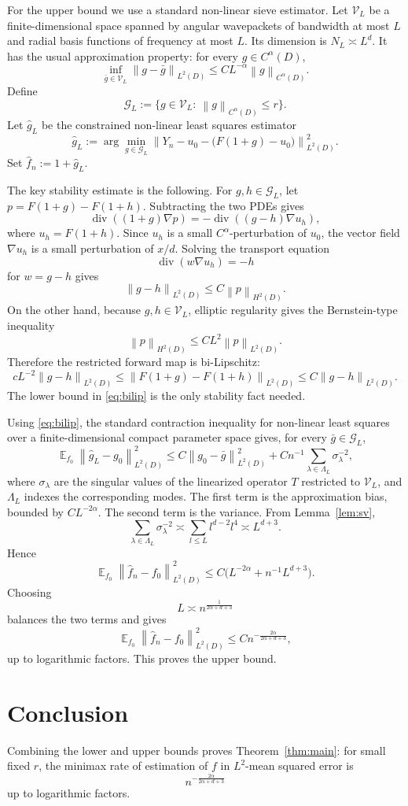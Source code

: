 \documentclass[11pt]{article}
\theoremstyle{remark}
\DeclareMathOperator{\div}{div}
\DeclareMathOperator{\E}{\mathbb{E}}
\newcommand{\norm}[1]{\left\|#1\right\|}
\begin{document}
For the upper bound we use a standard non-linear sieve estimator. Let
$\mathcal V_L$ be a finite-dimensional space spanned by angular wavepackets of
bandwidth at most $L$ and radial basis functions of frequency at most $L$. Its
dimension is $N_L\asymp L^d$. It has the usual approximation property: for every
$g\in C^\alpha(D)$,
\[
\inf_{\bar g\in\mathcal V_L}\norm{g-\bar g}_{L^2(D)}
\le C L^{-\alpha}\norm{g}_{C^\alpha(D)}.
\]
Define
\[
\mathcal G_L:=\{g\in\mathcal V_L:\ \norm{g}_{C^\alpha(D)}\le r\}.
\]
Let $\hat g_L$ be the constrained non-linear least squares estimator
\[
\hat g_L:=
\arg\min_{g\in\mathcal G_L}
\norm{Y_n-u_0-\bigl(F(1+g)-u_0\bigr)}_{L^2(D)}^2.
\]
Set $\hat f_n:=1+\hat g_L$.

The key stability estimate is the following. For $g,h\in\mathcal G_L$, let
$p=F(1+g)-F(1+h)$. Subtracting the two PDEs gives
\[
\div((1+g)\nabla p)=-\div((g-h)\nabla u_h),
\]
where $u_h=F(1+h)$. Since $u_h$ is a small $C^\alpha$-perturbation of $u_0$,
the vector field $\nabla u_h$ is a small perturbation of $x/d$. Solving the
transport equation
\[
\div(w\nabla u_h)=-h
\]
for $w=g-h$ gives
\[
\norm{g-h}_{L^2(D)}\le C\norm{p}_{H^2(D)}.
\]
On the other hand, because $g,h\in\mathcal V_L$, elliptic regularity gives the
Bernstein-type inequality
\[
\norm{p}_{H^2(D)}\le C L^2\norm{p}_{L^2(D)}.
\]
Therefore the restricted forward map is bi-Lipschitz:
\begin{equation}\label{eq:bilip}
c L^{-2}\norm{g-h}_{L^2(D)}
\le \norm{F(1+g)-F(1+h)}_{L^2(D)}
\le C\norm{g-h}_{L^2(D)}.
\end{equation}
The lower bound in \eqref{eq:bilip} is the only stability fact needed.

Using \eqref{eq:bilip}, the standard contraction inequality for non-linear least
squares over a finite-dimensional compact parameter space gives, for every
$\bar g\in\mathcal G_L$,
\[
\E_{f_0}\norm{\hat g_L-g_0}_{L^2(D)}^2
\le C\norm{g_0-\bar g}_{L^2(D)}^2
+C n^{-1}\sum_{\lambda\in\Lambda_L}\sigma_\lambda^{-2},
\]
where $\sigma_\lambda$ are the singular values of the linearized operator $T$
restricted to $\mathcal V_L$, and $\Lambda_L$ indexes the corresponding modes.
The first term is the approximation bias, bounded by $C L^{-2\alpha}$. The
second term is the variance. From Lemma~\ref{lem:sv},
\[
\sum_{\lambda\in\Lambda_L}\sigma_\lambda^{-2}
\asymp \sum_{l\le L} l^{d-2} l^4
\asymp L^{d+3}.
\]
Hence
\[
\E_{f_0}\norm{\hat f_n-f_0}_{L^2(D)}^2
\le C\bigl(L^{-2\alpha}+n^{-1}L^{d+3}\bigr).
\]
Choosing
\[
L\asymp n^{\frac1{2\alpha+d+3}}
\]
balances the two terms and gives
\[
\E_{f_0}\norm{\hat f_n-f_0}_{L^2(D)}^2
\le C n^{-\frac{2\alpha}{2\alpha+d+3}},
\]
up to logarithmic factors. This proves the upper bound.

\section{Conclusion}

Combining the lower and upper bounds proves Theorem~\ref{thm:main}: for small
fixed $r$, the minimax rate of estimation of $f$ in $L^2$-mean squared error is
\[
\boxed{\ n^{-\frac{2\alpha}{2\alpha+d+3}}\ }
\]
up to logarithmic factors.
\end{document}
